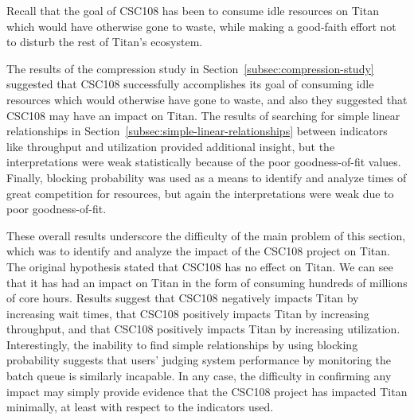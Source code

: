 


Recall that the goal of CSC108 has been to consume idle resources on Titan
which would have otherwise gone to waste, while making a good-faith effort not
to disturb the rest of Titan's ecosystem.

The results of the compression study in Section~\ref{subsec:compression-study}
suggested that CSC108 successfully accomplishes its goal of consuming idle
resources which would otherwise have gone to waste, and also they suggested
that CSC108 may have an impact on Titan. The results of searching for simple
linear relationships in Section~\ref{subsec:simple-linear-relationships}
between indicators like throughput and utilization provided additional insight,
but the interpretations were weak statistically because of the poor
goodness-of-fit values. Finally, blocking probability was used as a means to
identify and analyze times of great competition for resources, but again the
interpretations were weak due to poor goodness-of-fit.

These overall results underscore the difficulty of the main problem of this
section, which was to identify and analyze the impact of the CSC108 project on
Titan. The original hypothesis stated that CSC108 has no effect on Titan. We
can see that it has had an impact on Titan in the form of consuming hundreds of
millions of core hours. Results suggest that CSC108 negatively impacts Titan by
increasing wait times, that CSC108 positively impacts Titan by increasing
throughput, and that CSC108 positively impacts Titan by increasing utilization.
Interestingly, the inability to find simple relationships by using blocking
probability suggests that users' judging system performance by monitoring the
batch queue is similarly incapable. In any case, the difficulty in confirming
any impact may simply provide evidence that the CSC108 project has impacted
Titan minimally, at least with respect to the indicators used.

